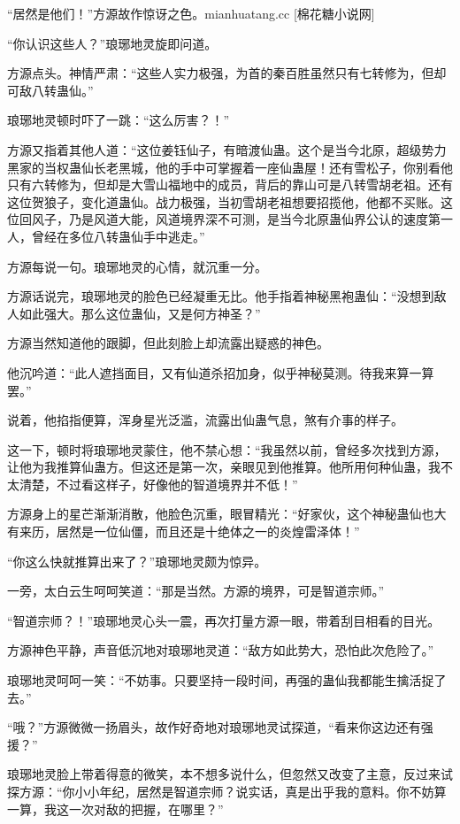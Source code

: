 \begin{this_body}
“居然是他们！”方源故作惊讶之色。mianhuatang.cc [棉花糖小说网]

“你认识这些人？”琅琊地灵旋即问道。

方源点头。神情严肃：“这些人实力极强，为首的秦百胜虽然只有七转修为，但却可敌八转蛊仙。”

琅琊地灵顿时吓了一跳：“这么厉害？！”

方源又指着其他人道：“这位姜钰仙子，有暗渡仙蛊。这个是当今北原，超级势力黑家的当权蛊仙长老黑城，他的手中可掌握着一座仙蛊屋！还有雪松子，你别看他只有六转修为，但却是大雪山福地中的成员，背后的靠山可是八转雪胡老祖。还有这位贺狼子，变化道蛊仙。战力极强，当初雪胡老祖想要招揽他，他都不买账。这位回风子，乃是风道大能，风道境界深不可测，是当今北原蛊仙界公认的速度第一人，曾经在多位八转蛊仙手中逃走。”

方源每说一句。琅琊地灵的心情，就沉重一分。

方源话说完，琅琊地灵的脸色已经凝重无比。他手指着神秘黑袍蛊仙：“没想到敌人如此强大。那么这位蛊仙，又是何方神圣？”

方源当然知道他的跟脚，但此刻脸上却流露出疑惑的神色。

他沉吟道：“此人遮挡面目，又有仙道杀招加身，似乎神秘莫测。待我来算一算罢。”

说着，他掐指便算，浑身星光泛滥，流露出仙蛊气息，煞有介事的样子。

这一下，顿时将琅琊地灵蒙住，他不禁心想：“我虽然以前，曾经多次找到方源，让他为我推算仙蛊方。但这还是第一次，亲眼见到他推算。他所用何种仙蛊，我不太清楚，不过看这样子，好像他的智道境界并不低！”

方源身上的星芒渐渐消散，他脸色沉重，眼冒精光：“好家伙，这个神秘蛊仙也大有来历，居然是一位仙僵，而且还是十绝体之一的炎煌雷泽体！”

“你这么快就推算出来了？”琅琊地灵颇为惊异。

一旁，太白云生呵呵笑道：“那是当然。方源的境界，可是智道宗师。”

“智道宗师？！”琅琊地灵心头一震，再次打量方源一眼，带着刮目相看的目光。

方源神色平静，声音低沉地对琅琊地灵道：“敌方如此势大，恐怕此次危险了。”

琅琊地灵呵呵一笑：“不妨事。只要坚持一段时间，再强的蛊仙我都能生擒活捉了去。”

“哦？”方源微微一扬眉头，故作好奇地对琅琊地灵试探道，“看来你这边还有强援？”

琅琊地灵脸上带着得意的微笑，本不想多说什么，但忽然又改变了主意，反过来试探方源：“你小小年纪，居然是智道宗师？说实话，真是出乎我的意料。你不妨算一算，我这一次对敌的把握，在哪里？”


\end{this_body}
